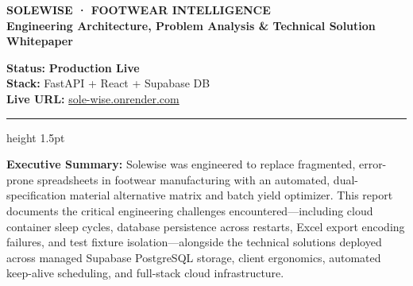 \documentclass[a4paper,10pt]{article}
\begin{document}
\begin{minipage}[c]{0.68\textwidth}
    {\LARGE \textbf{\color{soledark}SOLEWISE · FOOTWEAR INTELLIGENCE}} \\[2pt]
    {\small \color{soleterracotta} \textbf{Engineering Architecture, Problem Analysis \& Technical Solution Whitepaper}}
\end{minipage}
\hfill
\begin{minipage}[c]{0.30\textwidth}
    \raggedleft
    {\footnotesize \textbf{Status:} \color{solegreen} \textbf{Production Live}}\\[1pt]
    {\footnotesize \textbf{Stack:} FastAPI + React + Supabase DB}\\[1pt]
    {\footnotesize \textbf{Live URL:} \href{https://sole-wise.onrender.com}{sole-wise.onrender.com}}
\end{minipage}

\vspace{3pt}
{\color{soleterracotta}\hrule height 1.5pt}
\vspace{3pt}

\begin{tcolorbox}[colback=soleivory, colframe=soleborder, arc=3pt, boxrule=0.75pt, top=3.5pt, bottom=3.5pt, left=8pt, right=8pt]
    \footnotesize
    \textbf{Executive Summary:} \color{soledark}
    Solewise was engineered to replace fragmented, error-prone spreadsheets in footwear manufacturing with an automated, dual-specification material alternative matrix and batch yield optimizer. This report documents the critical engineering challenges encountered—including cloud container sleep cycles, database persistence across restarts, Excel export encoding failures, and test fixture isolation—alongside the technical solutions deployed across managed Supabase PostgreSQL storage, client ergonomics, automated keep-alive scheduling, and full-stack cloud infrastructure.
\end{tcolorbox}

\vspace{3pt}
\end{document}
